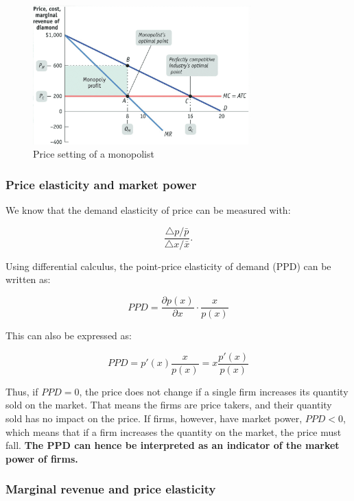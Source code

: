 \documentclass[
  12pt,
  oneside]{book}
\theoremstyle{definition}
\theoremstyle{definition}
\theoremstyle{definition}
\theoremstyle{definition}
\theoremstyle{remark}
\begin{document}
\begin{figure}
\centering
\includegraphics[width=0.75\textwidth,height=\textheight]{fig//mono2}
\caption[\label{fig:mono2} Price setting of a monopolist]{\label{fig:mono2} Price setting of a monopolist\footnotemark{}}
\end{figure}

\hypertarget{price-elasticity-and-market-power}{%
\subsubsection*{Price elasticity and market power}\label{price-elasticity-and-market-power}}

We know that the demand elasticity of price can be measured with:

\[ \frac{\triangle p/\bar{p}}{\triangle x / \bar{x}}. \]

Using differential calculus, the point-price elasticity of demand (PPD) can be written as:

\[ PPD = \frac{\partial p(x)}{\partial x} \cdot \frac{x}{p(x)} \]

This can also be expressed as:

\[ PPD = p'(x) \frac{x}{p(x)} = x \frac{p'(x)}{p(x)} \]

Thus, if \(PPD = 0\), the price does not change if a single firm increases its quantity sold on the market. That means the firms are price takers, and their quantity sold has no impact on the price. If firms, however, have market power, \(PPD < 0\), which means that if a firm increases the quantity on the market, the price must fall. \textbf{The PPD can hence be interpreted as an indicator of the market power of firms.}

\hypertarget{marginal-revenue-and-price-elasticity}{%
\subsubsection*{Marginal revenue and price elasticity}\label{marginal-revenue-and-price-elasticity}}
\end{document}
